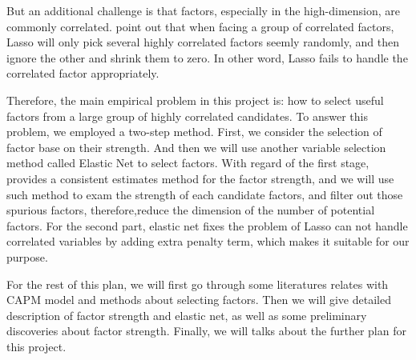 But an additional challenge is that factors, especially in the high-dimension, are commonly correlated.
 point out that when facing a group of correlated factors, Lasso will only pick several highly correlated factors seemly randomly, and then ignore the other and shrink them to zero. 
In other word, Lasso fails to handle the correlated factor appropriately.









Therefore, the main empirical problem in this project is: how to select useful factors from a large group of  highly correlated candidates.
To answer this problem, we employed a two-step method. 
First, we consider the selection of factor base on their strength.
And then we will use another variable selection method called Elastic Net \cite{Zou2005} to select factors.
With regard of the first stage,  provides a consistent estimates method for the factor strength, and we will use such method to exam the strength of each candidate factors, and filter out those spurious factors, therefore,reduce the dimension of the number of potential factors.
For the second part, elastic net fixes the problem of Lasso can not handle correlated variables by adding extra penalty term, which makes it suitable for our purpose. 

For the rest of this plan, we will first go through some literatures relates with CAPM model and methods about selecting factors. 
Then we will give detailed description of factor strength and elastic net, as well as some preliminary  discoveries about factor strength.
Finally, we will talks about the further plan for this project.




